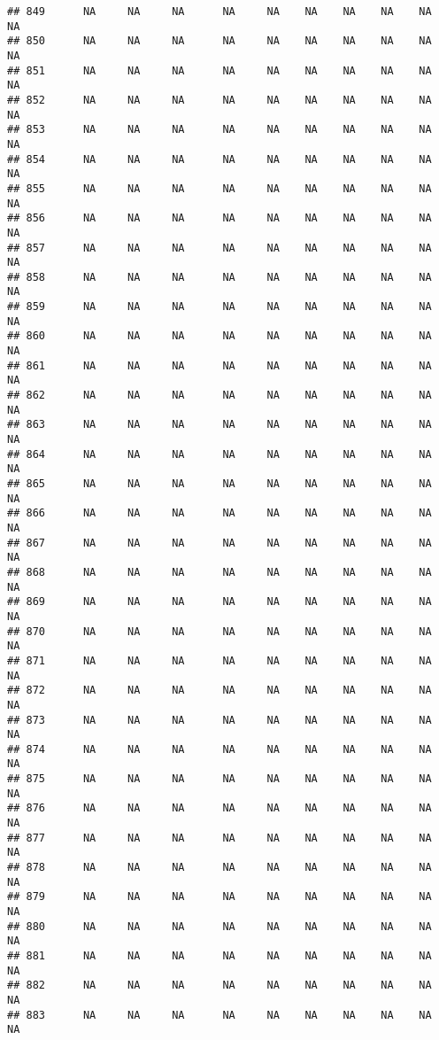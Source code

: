 \documentclass{article}\usepackage{graphicx, color}
\makeatletter
\newenvironment{kframe}{%
 \def\at@end@of@kframe{}%
 \ifinner\ifhmode%
  \def\at@end@of@kframe{\end{minipage}}%
  \begin{minipage}{\columnwidth}%
 \fi\fi%
 \def\FrameCommand##1{\hskip\@totalleftmargin \hskip-\fboxsep
 \colorbox{shadecolor}{##1}\hskip-\fboxsep
     \hskip-\linewidth \hskip-\@totalleftmargin \hskip\columnwidth}%
 \MakeFramed {\advance\hsize-\width
   \@totalleftmargin\z@ \linewidth\hsize
   \@setminipage}}%
 {\par\unskip\endMakeFramed%
 \at@end@of@kframe}
\newenvironment{knitrout}{}{} %
\makeatother
\begin{document}
\begin{knitrout}
\begin{kframe}
\begin{verbatim}
## 849      NA     NA     NA      NA     NA    NA    NA    NA    NA     NA
## 850      NA     NA     NA      NA     NA    NA    NA    NA    NA     NA
## 851      NA     NA     NA      NA     NA    NA    NA    NA    NA     NA
## 852      NA     NA     NA      NA     NA    NA    NA    NA    NA     NA
## 853      NA     NA     NA      NA     NA    NA    NA    NA    NA     NA
## 854      NA     NA     NA      NA     NA    NA    NA    NA    NA     NA
## 855      NA     NA     NA      NA     NA    NA    NA    NA    NA     NA
## 856      NA     NA     NA      NA     NA    NA    NA    NA    NA     NA
## 857      NA     NA     NA      NA     NA    NA    NA    NA    NA     NA
## 858      NA     NA     NA      NA     NA    NA    NA    NA    NA     NA
## 859      NA     NA     NA      NA     NA    NA    NA    NA    NA     NA
## 860      NA     NA     NA      NA     NA    NA    NA    NA    NA     NA
## 861      NA     NA     NA      NA     NA    NA    NA    NA    NA     NA
## 862      NA     NA     NA      NA     NA    NA    NA    NA    NA     NA
## 863      NA     NA     NA      NA     NA    NA    NA    NA    NA     NA
## 864      NA     NA     NA      NA     NA    NA    NA    NA    NA     NA
## 865      NA     NA     NA      NA     NA    NA    NA    NA    NA     NA
## 866      NA     NA     NA      NA     NA    NA    NA    NA    NA     NA
## 867      NA     NA     NA      NA     NA    NA    NA    NA    NA     NA
## 868      NA     NA     NA      NA     NA    NA    NA    NA    NA     NA
## 869      NA     NA     NA      NA     NA    NA    NA    NA    NA     NA
## 870      NA     NA     NA      NA     NA    NA    NA    NA    NA     NA
## 871      NA     NA     NA      NA     NA    NA    NA    NA    NA     NA
## 872      NA     NA     NA      NA     NA    NA    NA    NA    NA     NA
## 873      NA     NA     NA      NA     NA    NA    NA    NA    NA     NA
## 874      NA     NA     NA      NA     NA    NA    NA    NA    NA     NA
## 875      NA     NA     NA      NA     NA    NA    NA    NA    NA     NA
## 876      NA     NA     NA      NA     NA    NA    NA    NA    NA     NA
## 877      NA     NA     NA      NA     NA    NA    NA    NA    NA     NA
## 878      NA     NA     NA      NA     NA    NA    NA    NA    NA     NA
## 879      NA     NA     NA      NA     NA    NA    NA    NA    NA     NA
## 880      NA     NA     NA      NA     NA    NA    NA    NA    NA     NA
## 881      NA     NA     NA      NA     NA    NA    NA    NA    NA     NA
## 882      NA     NA     NA      NA     NA    NA    NA    NA    NA     NA
## 883      NA     NA     NA      NA     NA    NA    NA    NA    NA     NA

\end{verbatim}
\end{kframe}
\end{knitrout}
\end{document}
